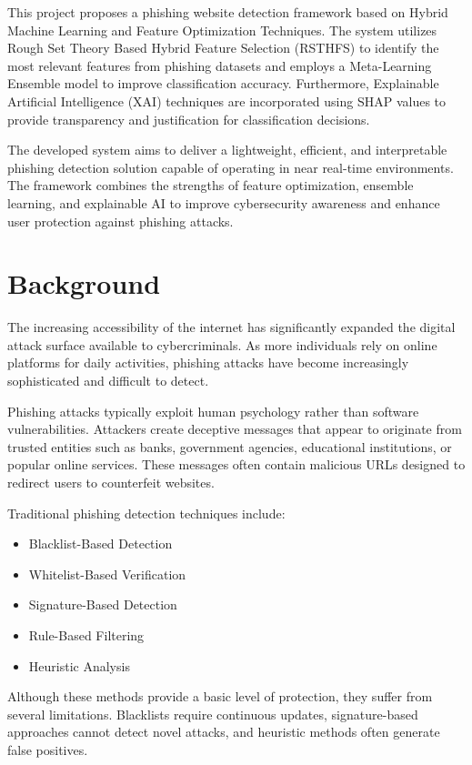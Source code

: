 \documentclass[12pt]{report}
\begin{document}
This project proposes a phishing website detection framework based on Hybrid Machine Learning and Feature Optimization Techniques. The system utilizes Rough Set Theory Based Hybrid Feature Selection (RSTHFS) to identify the most relevant features from phishing datasets and employs a Meta-Learning Ensemble model to improve classification accuracy. Furthermore, Explainable Artificial Intelligence (XAI) techniques are incorporated using SHAP values to provide transparency and justification for classification decisions.

The developed system aims to deliver a lightweight, efficient, and interpretable phishing detection solution capable of operating in near real-time environments. The framework combines the strengths of feature optimization, ensemble learning, and explainable AI to improve cybersecurity awareness and enhance user protection against phishing attacks.

\section{Background}

The increasing accessibility of the internet has significantly expanded the digital attack surface available to cybercriminals. As more individuals rely on online platforms for daily activities, phishing attacks have become increasingly sophisticated and difficult to detect.

Phishing attacks typically exploit human psychology rather than software vulnerabilities. Attackers create deceptive messages that appear to originate from trusted entities such as banks, government agencies, educational institutions, or popular online services. These messages often contain malicious URLs designed to redirect users to counterfeit websites.

Traditional phishing detection techniques include:

\begin{itemize}
    \item Blacklist-Based Detection
    \item Whitelist-Based Verification
    \item Signature-Based Detection
    \item Rule-Based Filtering
    \item Heuristic Analysis
\end{itemize}

Although these methods provide a basic level of protection, they suffer from several limitations. Blacklists require continuous updates, signature-based approaches cannot detect novel attacks, and heuristic methods often generate false positives.
\end{document}
